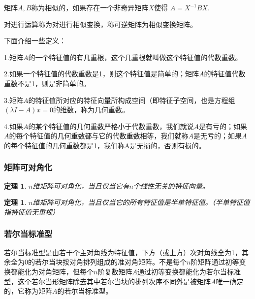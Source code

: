 \documentclass{article}
\begin{document}
\begin{definition}
矩阵$A,B$称为相似的，如果存在一个非奇异矩阵$X$使得   $A=X^{-1}BX.$  
\end{definition}

对进行运算称为对进行相似变换，称可逆矩阵为相似变换矩阵。

下面介绍一些定义：

1.矩阵$A$的一个特征值的有几重根，这个几重根就叫做这个特征值的代数重数。

2.如果一个特征值的代数重数是1，则这个特征值是简单的；矩阵$A$的特征值代数重数不是1，则是非简单的。

3.矩阵$A$的特征值所对应的特征向量所构成空间（即特征子空间，也是方程组$(λI-A)x=0$的维数，称为几何重数。

4.如果$A$的某个特征值的几何重数严格小于代数重数，我们就说$A$是有亏的；如果$A$的每个特征值的几何重数都与它的代数重数相等，我们就称$A$是无亏的；如果$A$的每个特征值的几何重数都是1，我们称A是无损的，否则有损的。
\subsubsection{矩阵可对角化}
\newtheorem{thm}{定理}
\begin{thm}
$n$维矩阵可对角化，当且仅当它有$n$个线性无关的特征向量。
\end{thm}

\newtheorem{thm}{定理}
\begin{thm}
$n$维矩阵可对角化，当且仅当它的所有特征值是半单特征值。（半单特征值指特征值无重根）
\end{thm}

\subsubsection{若尔当标准型}
\begin{definition}
若尔当标准型是由若干个主对角线为特征值，下方（或上方）次对角线全为1，其余全为0的若尔当块按对角排列组成的准对角矩阵。不是每个$n$阶矩阵通过初等变换都能化为对角矩阵，但每个$n$阶复数矩阵$A$通过初等变换都能化为若尔当标准型，这个若尔当形矩阵除去其中若尔当块的排列次序不同外是被矩阵$A$唯一确定的，它称为矩阵$A$的若尔当标准型。
\end{definition}
\end{document}
